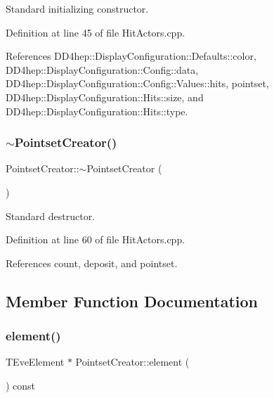 Standard initializing constructor. 



Definition at line 45 of file Hit\+Actors.\+cpp.



References D\+D4hep\+::\+Display\+Configuration\+::\+Defaults\+::color, D\+D4hep\+::\+Display\+Configuration\+::\+Config\+::data, D\+D4hep\+::\+Display\+Configuration\+::\+Config\+::\+Values\+::hits, pointset, D\+D4hep\+::\+Display\+Configuration\+::\+Hits\+::size, and D\+D4hep\+::\+Display\+Configuration\+::\+Hits\+::type.

\hypertarget{struct_d_d4hep_1_1_pointset_creator_a11cafd713490e23770130fa3f3c687bc}{}\label{struct_d_d4hep_1_1_pointset_creator_a11cafd713490e23770130fa3f3c687bc} 
\subsubsection{\texorpdfstring{$\sim$\+Pointset\+Creator()}{~PointsetCreator()}}
{\footnotesize\ttfamily Pointset\+Creator\+::$\sim$\+Pointset\+Creator (\begin{DoxyParamCaption}{ }\end{DoxyParamCaption})\hspace{0.3cm}{\ttfamily [virtual]}}



Standard destructor. 



Definition at line 60 of file Hit\+Actors.\+cpp.



References count, deposit, and pointset.



\subsection{Member Function Documentation}
\hypertarget{struct_d_d4hep_1_1_pointset_creator_a543467a3fc5f0c6779072483c48ca38b}{}\label{struct_d_d4hep_1_1_pointset_creator_a543467a3fc5f0c6779072483c48ca38b} 
\subsubsection{\texorpdfstring{element()}{element()}}
{\footnotesize\ttfamily T\+Eve\+Element $\ast$ Pointset\+Creator\+::element (\begin{DoxyParamCaption}{ }\end{DoxyParamCaption}) const}



